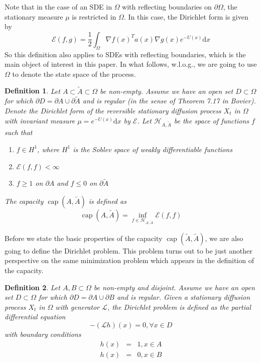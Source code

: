 \documentclass[english, aip, jcp, priprint, graphicx,floatfix]{revtex4-1}
\newtheorem{definition}{Definition}
\theoremstyle{plain}
\theoremstyle{definition}
\theoremstyle{plain}
\begin{document}
Note that in the case of an SDE in $\Omega$ with reflecting boundaries on
$\partial \Omega$, the stationary measure ${\mu}$ is restricted in
$\Omega$. In this case, the Dirichlet form is given by
\[ \mathcal{E} (f, g) = \frac{1}{2} \int_{\Omega} \nabla f (x)^T a (x) \nabla
g (x) e^{- U (x)} \mathrm{d} x \]
So this definition also applies to SDEs with reflecting boundaries, which is
the main object of interest in this paper. In what follows, w.l.o.g., we are
going to use $\Omega$ to denote the state space of the process.

\begin{definition}
Let $A \subset \tilde{A} \subset \Omega$ be non-empty. Assume we have an
open set $D \subset \Omega$ for which $\partial D = \partial A \cup \partial
\tilde{A}$ and is regular (in the sense of Theorem 7.17 in
Bovier\cite{Bovier2016-ez}). Denote the Dirichlet form of the reversible
stationary diffusion process $X_t$ in $\Omega$ with invariant measure
${\mu}= e^{- U (x)} \mathrm{d} x$ by $\mathcal{E}$. Let $\mathcal{H}_{A,
\tilde{A}}$ be the space of functions $f$ such that
\begin{enumerate}
\item $f \in H^1$, where $H^1$ is the Soblev space of weakly
differentiable functions

\item $\mathcal{E} (f, f) < \infty$

\item $f \geqslant 1$ on $\partial A$ and $f \leqslant 0$ on $\partial
\tilde{A}$
\end{enumerate}
The capacity $\ensuremath{\operatorname{cap}} (A, \tilde{A})$ is defined as
\[ \ensuremath{\operatorname{cap}} (A, \tilde{A}) = \inf_{f \in
\mathcal{H_{A, \tilde{A}}}} \mathcal{E} (f, f) \]
\end{definition}

Before we state the basic properties of the capacity
$\ensuremath{\operatorname{cap}} (\tilde{A}, \tilde{A})$, we are also going to
define the Dirichlet problem. This problem turns out to be just another
perspective on the same minimization problem which appears in the definition
of the capacity.

\begin{definition}
Let $A, B \subset \Omega$ be non-empty and disjoint. Assume we have an open
set $D \subset \Omega$ for which $\partial D = \partial A \cup \partial B$
and is regular. Given a stationary diffusion process $X_t$ in $\Omega$ with
generator $\mathcal{L}$, the Dirichlet problem is defined as the partial
differential equation
\[ - (\mathcal{L} h) (x) = 0, \forall x \in D \]
with boundary conditions
\begin{eqnarray*}
h (x) & = & 1, x \in A\\
h (x) & = & 0, x \in B
\end{eqnarray*}
\end{definition}
\end{document}
